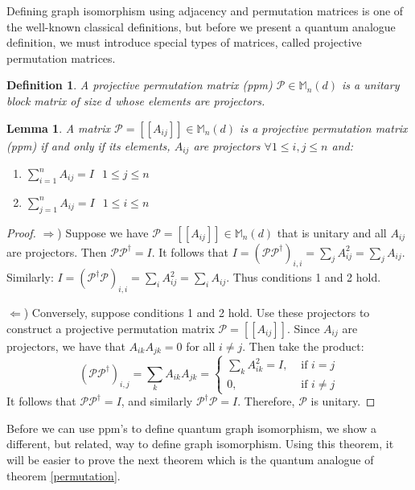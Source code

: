 \documentclass[12pt]{article}
\newtheorem{lem}[thm]{Lemma}
\newtheorem{defn}[thm]{Definition}
\begin{document}
Defining graph isomorphism using adjacency and permutation matrices is
one of the well-known classical definitions, but before we present a
quantum analogue definition, we must introduce special types of
matrices, called projective permutation matrices.

\begin{defn}
  A projective permutation matrix (ppm) $\mathcal{P} \in
  \mathbb{M}_n(d)$ is a unitary block matrix of size $d$ whose
  elements are projectors.
\end{defn}

\begin{lem}
  \label{ppm}
  A matrix $\mathcal{P} = [[A_{ij}]] \in \mathbb{M}_n(d)$ is a
  projective permutation matrix (ppm) if and only if its elements,
  $A_{ij}$ are projectors $\forall 1 \leq i, j \leq n$ and:
  \begin{enumerate}
  \item $\sum_{i=1}^n A_{ij} = I$ $ $ $1 \leq j \leq n$
  \item $\sum_{j=1}^n A_{ij} = I$ $ $ $1 \leq i \leq n$
  \end{enumerate}
\end{lem}

\begin{proof}
$\Rightarrow$) Suppose we have $\mathcal{P} = [[A_{ij}]] \in
  \mathbb{M}_n(d)$ that is unitary and all $A_{ij}$ are
  projectors. Then $\mathcal{P} \mathcal{P}^{\dag} = I$. It follows
  that $I = (\mathcal{P} \mathcal{P}^{\dag})_{i, i} = \sum_j A_{ij}^2
  = \sum_j A_{ij}$. Similarly: $I = (\mathcal{P}^{\dag}
  \mathcal{P})_{i, i} = \sum_i A_{ij}^2 = \sum_i A_{ij}$. Thus
  conditions 1 and 2 hold.

$\Leftarrow$) Conversely, suppose conditions 1 and 2 hold. Use these
  projectors to construct a projective permutation matrix $\mathcal{P}
  = [[A_{ij}]]$. Since $A_{ij}$ are projectors, we have that
  $A_{ik}A_{jk} = 0$ for all $i \neq j$. Then take the product:
\[ (\mathcal{P}\mathcal{P}^{\dag})_{i,j} = \sum_k A_{ik}A_{jk} = \begin{cases} 
\sum_k A_{ik}^2 = I, & \text{ if } i = j \\ 0, & \text{ if } i \neq
j \end{cases}
\]
It follows that $\mathcal{P}\mathcal{P}^{\dag} = I$, and similarly
$\mathcal{P}^{\dag} \mathcal{P} = I$. Therefore, $\mathcal{P}$ is
unitary.
\end{proof}

Before we can use ppm's to define quantum graph isomorphism, we show a
different, but related, way to define graph isomorphism. Using this
theorem, it will be easier to prove the next theorem which is the
quantum analogue of theorem \ref{permutation}.
\end{document}
